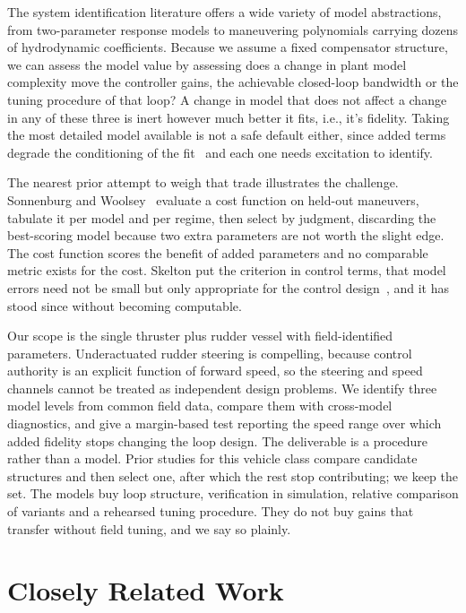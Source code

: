 \documentclass[conference]{IEEEtran}
\begin{document}
The system identification literature offers a wide variety of model abstractions, from two-parameter response models to maneuvering polynomials carrying dozens of hydrodynamic coefficients. Because we assume a fixed compensator structure, we can assess the model value by assessing does a change in plant model complexity move the controller gains, the achievable closed-loop bandwidth or the tuning procedure of that loop? A change in model that does not affect a change in any of these three is inert however much better it fits, i.e., it's fidelity. Taking the most detailed model available is not a safe default either, since added terms degrade the conditioning of the fit~\cite{alexandersson2022system,suarez2026regularized} and each one needs excitation to identify.

The nearest prior attempt to weigh that trade illustrates the challenge. Sonnenburg and Woolsey~\cite{sonnenburg2013modeling} evaluate a cost function on held-out maneuvers, tabulate it per model and per regime, then select by judgment, discarding the best-scoring model because two extra parameters are not worth the slight edge. The cost function scores the benefit of added parameters and no comparable metric exists for the cost. Skelton put the criterion in control terms, that model errors need not be small but only appropriate for the control design~\cite{skelton1989model}, and it has stood since without becoming computable. 

Our scope is the single thruster plus rudder vessel with field-identified parameters. Underactuated rudder steering is compelling, because control authority is an explicit function of forward speed, so the steering and speed channels cannot be treated as independent design problems. We identify three model levels from common field data, compare them with cross-model diagnostics, and give a margin-based test reporting the speed range over which added fidelity stops changing the loop design. The deliverable is a procedure rather than a model. Prior studies for this vehicle class compare candidate structures and then select one, after which the rest stop contributing; we keep the set. The models buy loop structure, verification in simulation, relative comparison of variants and a rehearsed tuning procedure. They do not buy gains that transfer without field tuning, and we say so plainly.

\section{Closely Related Work}
\label{sec:related}
\end{document}
